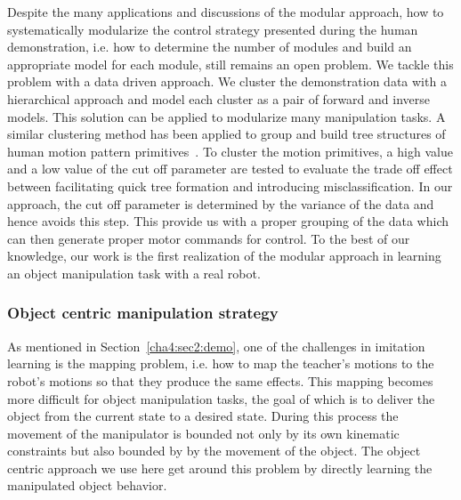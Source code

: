 Despite the many applications and discussions of the modular approach, how to systematically modularize the control strategy presented during the human demonstration, i.e. how to determine the number of modules and build an appropriate model for each module, still remains an open problem. We tackle this problem with a data driven approach. We cluster the demonstration data with a hierarchical approach and model each cluster as a pair of forward and inverse models. This solution can be applied to modularize many manipulation tasks. A similar clustering method has been applied to group and build tree structures of human motion pattern primitives~\cite{kulic2008incremental}. To cluster the motion primitives, a high value and a low value of the cut off parameter are tested to evaluate the trade off effect between facilitating quick tree formation and introducing misclassification. In our approach, the cut off parameter is determined by the variance of the data and hence avoids this step. This provide us with a proper grouping of the data which can then generate proper motor commands for control. To the best of our knowledge, our work is the first realization of the modular approach in learning an object manipulation task with a real robot.

%
%



\subsubsection{Object centric manipulation strategy}
\label{cha4:sec2:learn:objectlevel}


As mentioned in Section~\ref{cha4:sec2:demo}, one of the challenges in imitation learning is the mapping problem, i.e. how to map the teacher's motions to the robot's motions so that they produce the same effects. This mapping becomes more difficult for object manipulation tasks, the goal of which is to deliver the object from the current state to a desired state. During this process the movement of the manipulator is bounded not only by its own kinematic constraints but also bounded by by the movement of the object. The object centric approach we use here get around this problem by directly learning the manipulated object behavior.


